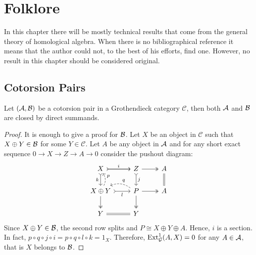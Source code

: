 \chapter{Folklore}

In this chapter there will be mostly technical results that come from the general theory of homological algebra. When there is no bibliographical reference it means that the author could not, to the best of his efforts, find one. However, no result in this chapter should be considered original.

\section{Cotorsion Pairs}

\begin{lemma}
  Let $(\mathcal{A},\mathcal{B})$ be a cotorsion pair in a Grothendieck category $\mathscr{C}$, then both $\mathcal{A}$ and $\mathcal{B}$ are closed by direct summands.
\end{lemma}

\begin{proof}
  It is enough to give a proof for $\mathcal{B}$. Let $X$ be an object in $\mathscr{C}$ such that $X\oplus Y\in\mathcal{B}$ for some $Y\in \mathscr{C}$. Let $A$ be any object in $\mathcal{A}$ and for any short exact sequence $0\to X\to Z\to A\to 0$ consider the pushout diagram:
  \begin{equation*}
    \begin{tikzcd}
      X\arrow[tail]{r}\arrow{r}{i}\arrow[tail]{d}[']{k}
      & Z\arrow[two heads]{r}\arrow[tail]{d}{j}
        & A\arrow[equal]{d}\\
      X\oplus Y\arrow[tail]{r}[']{l}\arrow[two heads]{d}\arrow[dashed,bend right]{u}[']{p}
      & P\arrow[two heads]{r}\arrow[two heads]{d}\arrow[dashed, bend right]{l}[']{q}
        & A\\
      Y\arrow[equal]{r}
      & Y
        &
    \end{tikzcd}
  \end{equation*}
  Since $X\oplus Y\in\mathcal{B}$, the second row splits and $P\cong X\oplus Y\oplus A$. Hence, $i$ is a section. In fact, $p\circ q\circ j\circ i = p\circ q\circ l\circ k =  1_X$. Therefore, $\operatorname{Ext}^1_{\mathcal{G}}(A,X)=0$ for any $A\in\mathcal{A}$, that is $X$ belongs to $\mathcal{B}$.
\end{proof}



